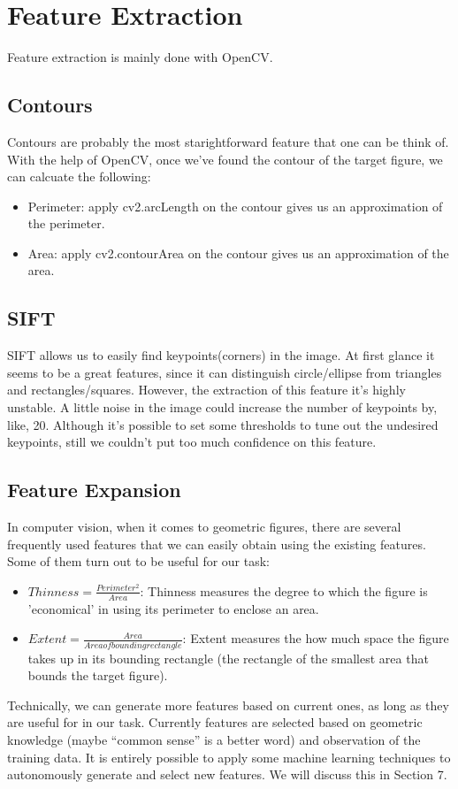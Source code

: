 \section{Feature Extraction}

Feature extraction is mainly done with OpenCV. 

\subsection{Contours}

Contours are probably the most starightforward feature that one can be think of. With the help of OpenCV, once we've found the contour of the target figure, we can calcuate the following:

\begin{itemize}
\item Perimeter: apply cv2.arcLength on the contour gives us an approximation of the perimeter.
\item Area: apply cv2.contourArea on the contour gives us an approximation of the area.
\end{itemize}

\subsection{SIFT}

SIFT allows us to easily find keypoints(corners) in the image. At first glance it seems to be a great features, since it can distinguish circle/ellipse from triangles and rectangles/squares. However, the extraction of this feature it's highly unstable. A little noise in the image could increase the number of keypoints by, like, 20. Although it's possible to set some thresholds to tune out the undesired keypoints, still we couldn't put too much confidence on this feature.

\subsection{Feature Expansion}

In computer vision, when it comes to geometric figures, there are several frequently used features that we can easily obtain using the existing features. Some of them turn out to be useful for our task:

\begin{itemize}
\item $Thinness = \frac{Perimeter^2}{Area}$: Thinness measures the degree to which the figure is 'economical' in using its perimeter to enclose an area. 
\item $Extent = \frac{Area}{Area of bounding rectangle}$: Extent measures the how much space the figure takes up in its bounding rectangle (the rectangle of the smallest area that bounds the target figure).
\end{itemize}

Technically, we can generate more features based on current ones, as long as they are useful for in our task. Currently features are selected based on geometric knowledge (maybe ``common sense'' is a better word) and observation of the training data. It is entirely possible to apply some machine learning techniques to autonomously generate and select new features. We will discuss this in Section 7.
